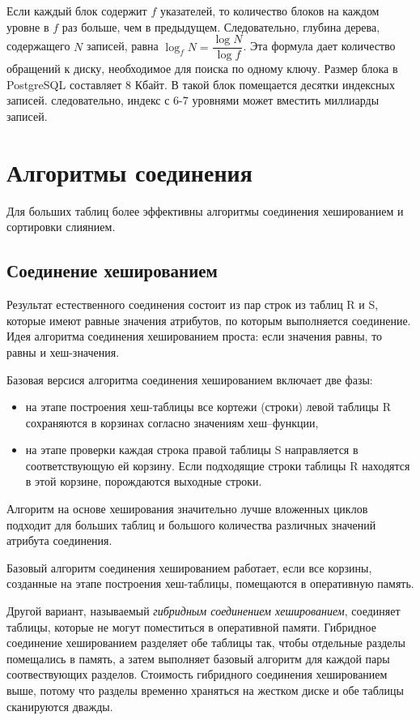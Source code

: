 \documentclass[%
	11pt,
	a4paper,
	utf8,
		]{article}
\begin{document}
Если каждый блок содержит $ f $ указателей, то количество блоков на каждом уровне в $ f $ раз больше, чем в предыдущем. Следовательно, глубина дерева, содержащего $ N $ записей, равна $ \log_f N = \dfrac{\log N}{\log f} $. Эта формула дает количество обращений к диску, необходимое для поиска по одному ключу. Размер блока в PostgreSQL составляет 8 Кбайт. В такой блок помещается десятки индексных записей. следовательно, индекс с 6-7 уровнями может вместить миллиарды записей.

\section{Алгоритмы соединения}

Для больших таблиц более эффективны алгоритмы соединения хешированием и сортировки слиянием.

\subsection{Соединение хешированием}

Результат естественного соединения состоит из пар строк из таблиц R и S, которые имеют равные значения атрибутов, по которым выполняется соединение. Идея алгоритма соединения хешированием проста: если значения равны, то равны и хеш-значения.

Базовая версися алгоритма соединения хешированием включает две фазы:
\begin{itemize}
	\item на этапе построения хеш-таблицы все кортежи (строки) левой таблицы R сохраняются в корзинах согласно значениям хеш--функции,
	
	\item на этапе проверки каждая строка правой таблицы S направляется в соответствующую ей корзину. Если подходящие строки таблицы R находятся в этой корзине, порождаются выходные строки.
\end{itemize}

Алгоритм на основе хеширования значительно лучше вложенных циклов подходит для больших таблиц и большого количества различных значений атрибута соединения.

Базовый алгоритм соединения хешированием работает, если все корзины, созданные на этапе построения хеш-таблицы, помещаются в оперативную память. 

Другой вариант, называемый \emph{гибридным соединением хешированием}, соединяет таблицы, которые не могут поместиться в оперативной памяти. Гибридное соединение хешированием разделяет обе таблицы так, чтобы отдельные разделы помещались в память, а затем выполняет базовый алгоритм для каждой пары соотвествующих разделов. Стоимость гибридного соединения хешированием выше, потому что разделы временно храняться на жестком диске и обе таблицы сканируются дважды.
\end{document}
